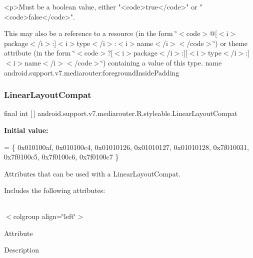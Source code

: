 \begin{DoxyVerb}      <p>Must be a boolean value, either "<code>true</code>" or "<code>false</code>".
\end{DoxyVerb}
 

This may also be a reference to a resource (in the form \char`\"{}$<$code$>$@\mbox{[}$<$i$>$package$<$/i$>$\+:\mbox{]}$<$i$>$type$<$/i$>$\+:$<$i$>$name$<$/i$>$$<$/code$>$\char`\"{}) or theme attribute (in the form \char`\"{}$<$code$>$?\mbox{[}$<$i$>$package$<$/i$>$\+:\mbox{]}\mbox{[}$<$i$>$type$<$/i$>$\+:\mbox{]}$<$i$>$name$<$/i$>$$<$/code$>$\char`\"{}) containing a value of this type.  name android.\+support.\+v7.\+mediarouter\+:foreground\+Inside\+Padding \mbox{\label{classandroid_1_1support_1_1v7_1_1mediarouter_1_1R_1_1styleable_a47eee9f8c488407b3ea7145bb65c01b9}} 
\subsubsection{\texorpdfstring{Linear\+Layout\+Compat}{LinearLayoutCompat}}
{\footnotesize\ttfamily final int \mbox{[}$\,$\mbox{]} android.\+support.\+v7.\+mediarouter.\+R.\+styleable.\+Linear\+Layout\+Compat\hspace{0.3cm}{\ttfamily [static]}}

{\bfseries Initial value\+:}
\begin{DoxyCode}
= \{
            0x010100af, 0x010100c4, 0x01010126, 0x01010127,
            0x01010128, 0x7f010031, 0x7f0100c5, 0x7f0100c6,
            0x7f0100c7
        \}
\end{DoxyCode}
Attributes that can be used with a Linear\+Layout\+Compat. 

Includes the following attributes\+:

\tabulinesep=1mm
\begin{longtabu} spread 0pt [c]{*{0}{|X[-1]}|}
\hline
\end{longtabu}
$<$colgroup align=\char`\"{}left\char`\"{}$>$ 

Attribute

Description 

